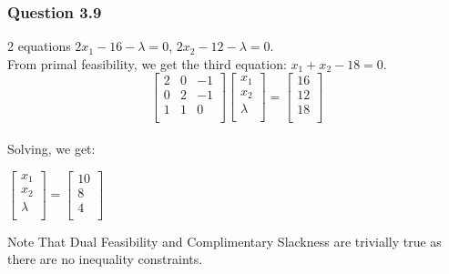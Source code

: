 \documentclass{beamer}
\begin{document}




\begin{frame}
\frametitle{Question 3.9}

 2 equations $2x_1 - 16 - \lambda =0$, $2x_2 - 12 - \lambda=0$.\\
From primal feasibility, we get the third equation: $x_1+x_2-18=0$.
\begin{equation*}
    \begin{bmatrix}
    2       & 0 & -1  \\
   0       & 2 & -1  \\

   1      & 1 & 0 \\
\end{bmatrix}
  \begin{bmatrix}
    x_1  \\
   x_2  \\

   \lambda \\
\end{bmatrix}
=\begin{bmatrix}
    16  \\
   12  \\
   18 \\
\end{bmatrix}

\end{equation*}\\
Solving, we get:
\begin{center}
    

$

  \begin{bmatrix}
    x_1  \\
   x_2  \\

   \lambda \\
\end{bmatrix}
=\begin{bmatrix}
    10  \\
   8  \\

   4 \\
\end{bmatrix}

$
\end{center}

Note That Dual Feasibility and Complimentary Slackness are trivially true as there are no inequality constraints.
\end{frame}
\end{document}
